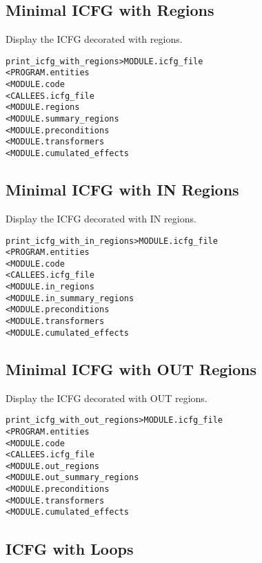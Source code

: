 \documentclass[a4paper]{report}
\newenvironment{PipsMake}{\begin{alltt}}{\end{alltt}}
\begin{document}
\subsection{Minimal ICFG with Regions}

Display the ICFG decorated with regions.
\begin{PipsMake}
print_icfg_with_regions                  > MODULE.icfg_file
        < PROGRAM.entities
        < MODULE.code
        < CALLEES.icfg_file
        < MODULE.regions
        < MODULE.summary_regions
        < MODULE.preconditions
        < MODULE.transformers
        < MODULE.cumulated_effects
\end{PipsMake}

\subsection{Minimal ICFG with IN Regions}

Display the ICFG decorated with IN regions.
\begin{PipsMake}
print_icfg_with_in_regions               > MODULE.icfg_file
        < PROGRAM.entities
        < MODULE.code
        < CALLEES.icfg_file
        < MODULE.in_regions
        < MODULE.in_summary_regions
        < MODULE.preconditions
        < MODULE.transformers
        < MODULE.cumulated_effects
\end{PipsMake}

\subsection{Minimal ICFG with OUT Regions}

Display the ICFG decorated with OUT regions.
\begin{PipsMake}
print_icfg_with_out_regions              > MODULE.icfg_file
        < PROGRAM.entities
        < MODULE.code
        < CALLEES.icfg_file
        < MODULE.out_regions
        < MODULE.out_summary_regions
        < MODULE.preconditions
        < MODULE.transformers
        < MODULE.cumulated_effects
\end{PipsMake}

\subsection{ICFG with Loops}
\end{document}
